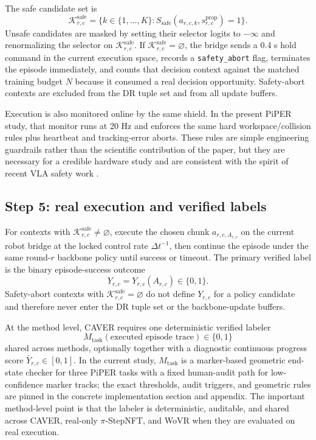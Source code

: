 \documentclass[10pt]{article}
\theoremstyle{plain}
\theoremstyle{definition}
\theoremstyle{remark}
\begin{document}
The safe candidate set is
\[
\mathcal K^{\mathrm{safe}}_{r,c}=\{k\in\{1,\dots,K\}:S_{\mathrm{safe}}(a_{r,c,k},s^{\mathrm{prop}}_{r,c})=1\}.
\]
Unsafe candidates are masked by setting their selector logits to $-\infty$ and renormalizing the selector on $\mathcal K^{\mathrm{safe}}_{r,c}$. If $\mathcal K^{\mathrm{safe}}_{r,c}=\varnothing$, the bridge sends a 0.4 s hold command in the current execution space, records a \texttt{safety\_abort} flag, terminates the episode immediately, and counts that decision context against the matched training budget $N$ because it consumed a real decision opportunity. Safety-abort contexts are excluded from the DR tuple set and from all update buffers.

Execution is also monitored online by the same shield. In the present PiPER study, that monitor runs at 20 Hz and enforces the same hard workspace/collision rules plus heartbeat and tracking-error aborts. These rules are simple engineering guardrails rather than the scientific contribution of the paper, but they are necessary for a credible hardware study and are consistent with the spirit of recent VLA safety work \citep{gu2025safe,zhang2025safevla}.

\subsection{Step 5: real execution and verified labels}
For contexts with $\mathcal K^{\mathrm{safe}}_{r,c}\neq\varnothing$, execute the chosen chunk $a_{r,c,A_{r,c}}$ on the current robot bridge at the locked control rate $\Delta t^{-1}$, then continue the episode under the same round-$r$ backbone policy until success or timeout. The primary verified label is the binary episode-success outcome
\[
Y_{r,c}=Y_{r,c}(A_{r,c})\in\{0,1\}.
\]
Safety-abort contexts with $\mathcal K^{\mathrm{safe}}_{r,c}=\varnothing$ do not define $Y_{r,c}$ for a policy candidate and therefore never enter the DR tuple set or the backbone-update buffers.

At the method level, CAVER requires one deterministic verified labeler
\[
M_{\mathrm{task}}(\text{executed episode trace})\in\{0,1\}
\]
shared across methods, optionally together with a diagnostic continuous progress score $\bar Y_{r,c}\in[0,1]$. In the current study, $M_{\mathrm{task}}$ is a marker-based geometric end-state checker for three PiPER tasks with a fixed human-audit path for low-confidence marker tracks; the exact thresholds, audit triggers, and geometric rules are pinned in the concrete implementation section and appendix. The important method-level point is that the labeler is deterministic, auditable, and shared across CAVER, real-only $\pi$-StepNFT, and WoVR when they are evaluated on real execution.
\end{document}
